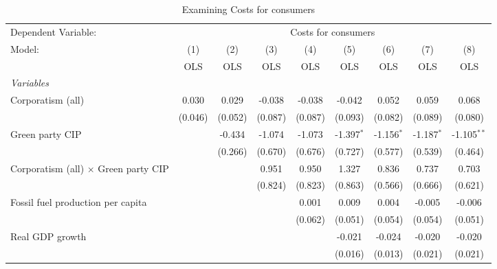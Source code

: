 
\begin{table}[htbp]
   \caption{Examining Costs for consumers}
   \centering
   \begin{tabular}{lcccccccc}
      \toprule
      Dependent Variable: & \multicolumn{8}{c}{Costs for consumers}\\
      Model:                                      & (1)     & (2)     & (3)     & (4)     & (5)          & (6)          & (7)          & (8)\\  
                                                  &  OLS    & OLS     & OLS     & OLS     & OLS          & OLS          & OLS          & OLS\\  
      \midrule
      \emph{Variables}\\
      Corporatism (all)                           & 0.030   & 0.029   & -0.038  & -0.038  & -0.042       & 0.052        & 0.059        & 0.068\\   
                                                  & (0.046) & (0.052) & (0.087) & (0.087) & (0.093)      & (0.082)      & (0.089)      & (0.080)\\   
      Green party CIP                             &         & -0.434  & -1.074  & -1.073  & -1.397$^{*}$ & -1.156$^{*}$ & -1.187$^{*}$ & -1.105$^{**}$\\   
                                                  &         & (0.266) & (0.670) & (0.676) & (0.727)      & (0.577)      & (0.539)      & (0.464)\\   
      Corporatism (all) $\times$ Green party CIP  &         &         & 0.951   & 0.950   & 1.327        & 0.836        & 0.737        & 0.703\\   
                                                  &         &         & (0.824) & (0.823) & (0.863)      & (0.566)      & (0.666)      & (0.621)\\   
      Fossil fuel production per capita           &         &         &         & 0.001   & 0.009        & 0.004        & -0.005       & -0.006\\   
                                                  &         &         &         & (0.062) & (0.051)      & (0.054)      & (0.054)      & (0.051)\\   
      Real GDP growth                             &         &         &         &         & -0.021       & -0.024       & -0.020       & -0.020\\   
                                                  &         &         &         &         & (0.016)      & (0.013)      & (0.021)      & (0.021)\\   

\end{tabular}
\end{table}

